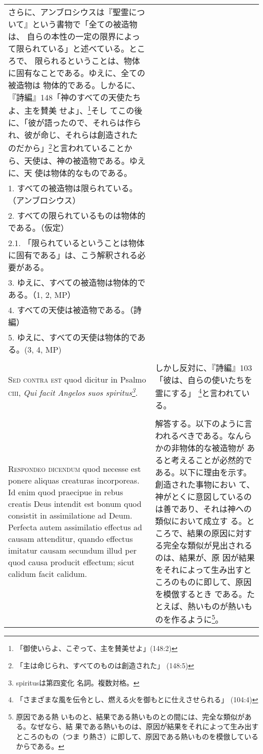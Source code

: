 \documentclass[10pt]{jsarticle} %
\begin{document}
\begin{longtable}{p{21em}p{21em}}
 さらに、アンブロシウスは『聖霊について』という書物で「全ての被造物は、
 自らの本性の一定の限界によって限られている」と述べている。ところで、
 限られるということは、物体に固有なことである。ゆえに、全ての被造物は
 物体的である。しかるに、『詩編』148「神のすべての天使たちよ、主を賛美
 せよ」、\footnote{「御使いらよ、こぞって、主を賛美せよ」(148:2)}そし
 てこの後に、「彼が語ったので、それらは作られ、彼が命じ、それらは創造された
 のだから」\footnote{「主は命じられ、すべてのものは創造された」
 (148:5)}と言われていることから、天使は、神の被造物である。ゆえに、天
 使は物体的なものである。\footnote{
推論の構造に注意。\\
1. すべての被造物は限られている。（アンブロシウス）\\
2. すべての限られているものは物体的である。（仮定）\\
2.1. 「限られているということは物体に固有である」は、こう解釈される必要がある。 \\
3. ゆえに、すべての被造物は物体的である。（1, 2, MP）\\
4. すべての天使は被造物である。（詩編）\\
5. ゆえに、すべての天使は物体的である。(3, 4, MP)
}

 \\\\

 {\scshape Sed contra est} quod dicitur in Psalmo {\scshape ciii},
{\itshape Qui facit Angelos suos spiritus\footnote{spiritusは第四変化
名詞。複数対格。}}.


&

しかし反対に、『詩編』103「彼は、自らの使いたちを霊にする」
 \footnote{「さまざまな風を伝令とし、燃える火を御もとに仕えさせられる」
 (104:4)}と言われている。
\\\\


{\scshape Respondeo dicendum} quod necesse est ponere aliquas
creaturas incorporeas. Id enim quod praecipue in rebus creatis Deus
intendit est bonum quod consistit in assimilatione ad Deum. Perfecta
autem assimilatio effectus ad causam attenditur, quando effectus
imitatur causam secundum illud per quod causa producit effectum; sicut
calidum facit calidum.

&

解答する。以下のように言われるべきである。なんらかの非物体的な被造物が
あると考えることが必然的である。以下に理由を示す。創造された事物におい
て、神がとくに意図しているのは善であり、それは神への類似において成立す
る。ところで、結果の原因に対する完全な類似が見出されるのは、結果が、原
因が結果をそれによって生み出すところのものに即して、原因を模倣するとき
である。たとえば、熱いものが熱いものを作るように\footnote{原因である熱
いものと、結果である熱いものとの間には、完全な類似がある。なぜなら、結
果である熱いものは、原因が結果をそれによって生み出すところのもの（つま
り熱さ）に即して、原因である熱いものを模倣しているからである。}。


\end{longtable}
\end{document}
